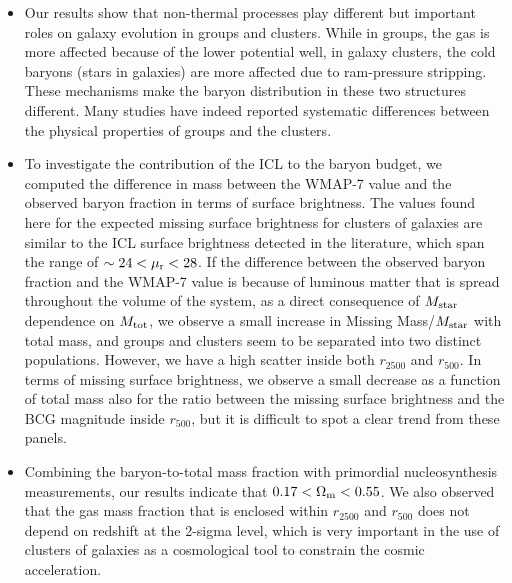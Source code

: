\documentclass{aa}
\begin{document}
\begin{itemize}
    
    
\item{Our results show that non-thermal processes play
      different but important roles on galaxy evolution in groups and
      clusters. While in groups, the gas is more affected because of the lower
      potential well, in galaxy clusters, the cold baryons (stars in
      galaxies) are more affected due to ram-pressure stripping.
      These mechanisms make the baryon distribution in these two
      structures  different.  Many studies have indeed reported
      systematic differences between the physical properties of groups
      and the clusters.}

\item{To investigate the contribution of the ICL to the baryon
      budget, we computed the difference in mass between the WMAP-7
      value and the observed baryon fraction in terms of surface
      brightness. 
      The values found here for
      the expected missing surface brightness for clusters of galaxies are
      similar to the ICL surface brightness detected in the
      literature, which span the range of $\sim 24 < \mu_{\rm r} < 28$.
      If the difference between the observed baryon fraction and the WMAP-7 value is because of luminous
      matter that is spread throughout the volume of the system, 
      as a direct consequence of $M_{\rm star}$ dependence on $M_{\rm tot}$,
      we observe a small increase in Missing Mass/$M_{\rm star}$ with total mass,
      and groups and clusters seem to be separated into two distinct populations.  
      However, we have a high scatter inside both $r_{2500}$ and $r_{500}$.
      In terms of missing surface brightness, we observe a 
      small decrease as a function of total mass also for the 
       ratio between the missing surface brightness and the BCG
      magnitude inside $r_{500}$, but it is difficult to spot a clear trend from these panels.}
    
\item{Combining the baryon-to-total mass fraction with
      primordial nucleosynthesis measurements, our results indicate
      that $0.17 < \Omega_{\rm m} < 0.55$. We also observed that
      the gas mass fraction that is enclosed within $r_{2500}$
      and $r_{500}$ does not depend on redshift at the 2-sigma level, which is very
      important in the use of clusters of galaxies as a cosmological tool to
      constrain the cosmic acceleration.}
    

\end{itemize}
\end{document}
